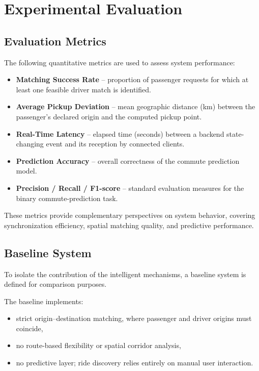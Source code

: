 \section{Experimental Evaluation}

\subsection{Evaluation Metrics}

The following quantitative metrics are used to assess system performance:

\begin{itemize}
    \item \textbf{Matching Success Rate} -- proportion of passenger requests for which at least one feasible driver match is identified.
    
    \item \textbf{Average Pickup Deviation} -- mean geographic distance (km) between the passenger's declared origin and the computed pickup point.
    
    \item \textbf{Real-Time Latency} -- elapsed time (seconds) between a backend state-changing event and its reception by connected clients.
    
    \item \textbf{Prediction Accuracy} -- overall correctness of the commute prediction model.
    
    \item \textbf{Precision / Recall / F1-score} -- standard evaluation measures for the binary commute-prediction task.
\end{itemize}

These metrics provide complementary perspectives on system behavior, covering synchronization efficiency, spatial matching quality, and predictive performance.


\subsection{Baseline System}

To isolate the contribution of the intelligent mechanisms, a baseline system is defined for comparison purposes.

The baseline implements:

\begin{itemize}
    \item strict origin--destination matching, where passenger and driver origins must coincide,
    
    \item no route-based flexibility or spatial corridor analysis,
    
    \item no predictive layer; ride discovery relies entirely on manual user interaction.
\end{itemize}

